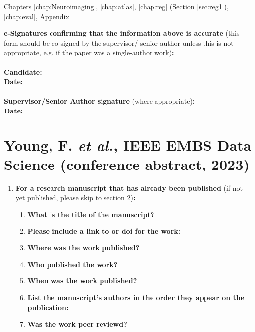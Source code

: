 {\begin{enumerate}[leftmargin=*,label={\bfseries\arabic*.}]
	Chapters \ref{chap:Neuroimaging}, \ref{chap:atlas}, \ref{chap:reg} (Section \ref{sec:reg1}), \ref{chap:eval}, Appendix
	\end{enumerate}

	\textbf{e-Signatures confirming that the information above is accurate}
	(this form should be co-signed by the supervisor/ senior author unless this is not appropriate, e.g. if the paper was a single-author work)\textbf{:}\\
	\textbf{}\\
	\textbf{Candidate:}\\
	\textbf{Date:}\\
	\textbf{}\\
	\textbf{Supervisor/Senior Author signature} (where appropriate)\textbf{:}\\
	\textbf{Date:}

\section*{Young, F. \textit{et al.}, IEEE EMBS Data Science (conference abstract, 2023)}
\begin{enumerate}[leftmargin=*,label={\bfseries\arabic*.}]\itemsep0em
	\item \textbf{For a research manuscript that has already been published} (if not yet published, please skip to section 2)\textbf{:}
	\begin{enumerate}[label={\alph*)}]\itemsep0em
	\item \textbf{What is the title of the manuscript?}

	\item \textbf{Please include a link to or doi for the work:}

	\item \textbf{Where was the work published?}

	\item \textbf{Who published the work?}

	\item \textbf{When was the work published?}

	\item \textbf{List the manuscript's authors in the order they appear on the publication:}

	\item \textbf{Was the work peer reviewd?}


\end{enumerate}
\end{enumerate}}

